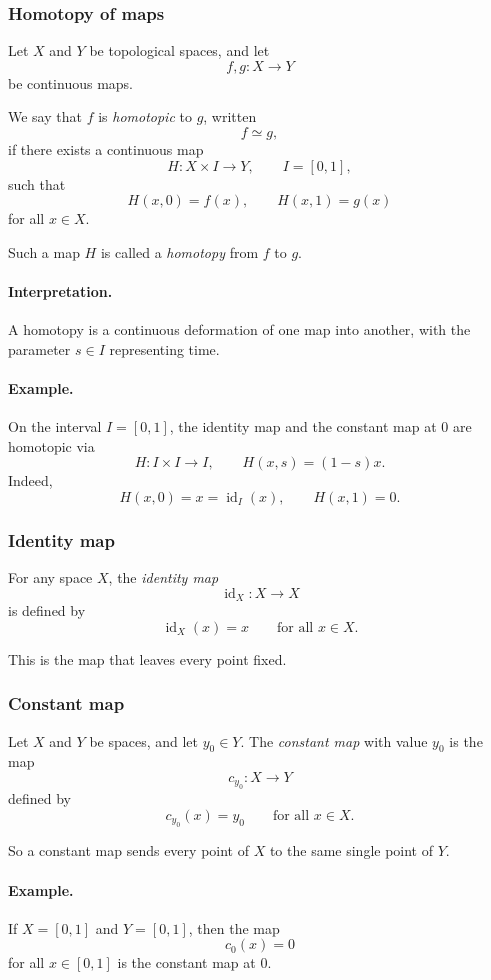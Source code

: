 \documentclass[12pt,a4paper]{article}
\theoremstyle{notespace}
\begin{document}
\subsubsection{Homotopy of maps}

Let \(X\) and \(Y\) be topological spaces, and let
\[
f,g:X\to Y
\]
be continuous maps.

We say that \(f\) is \emph{homotopic} to \(g\), written
\[
f\simeq g,
\]
if there exists a continuous map
\[
H:X\times I\to Y,
\qquad I=[0,1],
\]
such that
\[
H(x,0)=f(x),
\qquad
H(x,1)=g(x)
\]
for all \(x\in X\).

Such a map \(H\) is called a \emph{homotopy} from \(f\) to \(g\).

\paragraph{Interpretation.}
A homotopy is a continuous deformation of one map into another, with the parameter \(s\in I\) representing time.

\paragraph{Example.}
On the interval \(I=[0,1]\), the identity map and the constant map at \(0\) are homotopic via
\[
H:I\times I\to I,
\qquad
H(x,s)=(1-s)x.
\]
Indeed,
\[
H(x,0)=x=\operatorname{id}_I(x),
\qquad
H(x,1)=0.
\]

\subsubsection{Identity map}

For any space \(X\), the \emph{identity map}
\[
\operatorname{id}_X:X\to X
\]
is defined by
\[
\operatorname{id}_X(x)=x
\qquad
\text{for all }x\in X.
\]

This is the map that leaves every point fixed.

\subsubsection{Constant map}

Let \(X\) and \(Y\) be spaces, and let \(y_0\in Y\).  
The \emph{constant map} with value \(y_0\) is the map
\[
c_{y_0}:X\to Y
\]
defined by
\[
c_{y_0}(x)=y_0
\qquad
\text{for all }x\in X.
\]

So a constant map sends every point of \(X\) to the same single point of \(Y\).

\paragraph{Example.}
If \(X=[0,1]\) and \(Y=[0,1]\), then the map
\[
c_0(x)=0
\]
for all \(x\in[0,1]\) is the constant map at \(0\).
\end{document}

